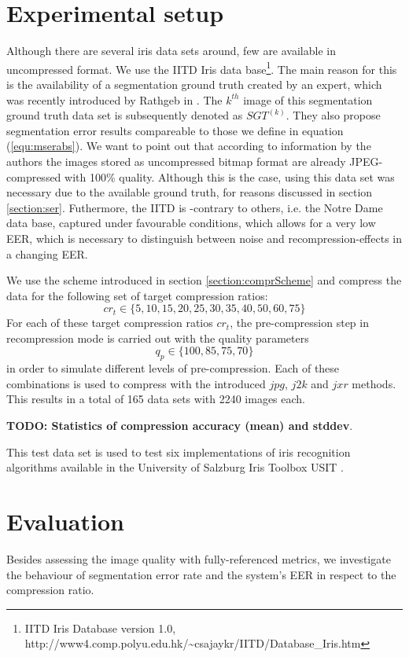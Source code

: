 \documentclass[10pt,twocolumn,letterpaper]{article}
\begin{document}
\section{Experimental setup}
\label{section:exSetup}
Although there are several iris data sets around, few are available in uncompressed format. We use the IITD Iris data base\footnote{IITD Iris Database version 1.0, http://www4.comp.polyu.edu.hk/\textasciitilde csajaykr/IITD/Database\_Iris.htm}. The main reason for this is the availability of a segmentation ground truth created by an expert, which was recently introduced by Rathgeb \etal in \cite{severeCompression}. The $k^{th}$ image of this segmentation ground truth data set is subsequently denoted as $SGT^{(k)}$. They also propose segmentation error results compareable to those we define in equation (\ref{equ:mserabs}).
We want to point out that according to information by the authors the images stored as uncompressed bitmap format are already JPEG-compressed with 100\% quality. Although this is the case, using this data set was necessary due to the available ground truth, for reasons discussed in section \ref{section:ser}. Futhermore, the IITD is -contrary to others, i.e. the Notre Dame data base, captured under favourable conditions, which allows for a very low EER, which is necessary to distinguish between noise and recompression-effects in a changing EER. 

We use the scheme introduced in section \ref{section:comprScheme} and compress the data for the following set of target compression ratios:
\begin{equation}
cr_t \in \{5,10,15,20,25,30,35,40,50,60,75\}
\end{equation}
For each of these target compression ratios $cr_t$, the pre-compression step in recompression mode is carried out with the quality parameters
\begin{equation}
q_p \in \{100, 85, 75, 70\}
\end{equation} 
in order to simulate different levels of pre-compression. Each of these combinations is used to compress with the introduced $jpg$, $j2k$ and $jxr$ methods. This results in a total of 165 data sets with 2240 images each.

\textbf{TODO: Statistics of compression accuracy (mean) and stddev}.

This test data set is used to test six implementations of iris recognition algorithms available in the University of Salzburg Iris Toolbox USIT \cite{rathgeb}. 


\section{Evaluation}
\label{section:eval}
 Besides assessing the image quality with fully-referenced metrics, we investigate the behaviour of segmentation error rate and the system's EER in respect to the compression ratio.
\end{document}

